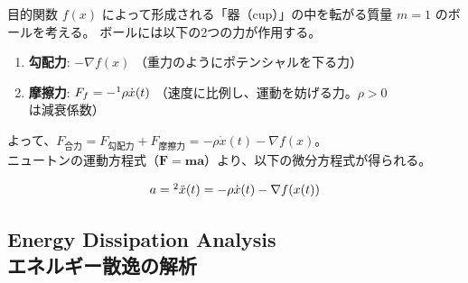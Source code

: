 \documentclass[dvipdfmx,a4paper,11pt]{jsarticle}
\begin{document}
目的関数 $f(x)$ によって形成される「器（cup）」の中を転がる質量 $m=1$ のボールを考える。
ボールには以下の2つの力が作用する。
\begin{enumerate}
    \item \textbf{勾配力}: $-\nabla f(x)$ （重力のようにポテンシャルを下る力）
    \item \textbf{摩擦力}: $F_f = -\footnotemark[1]\rho \dot{x}(t)$ （速度に比例し、運動を妨げる力。$\rho > 0$ は減衰係数）
\end{enumerate}
\noindent
よって、$F_{\textbf{合力}} = F_{\textbf{勾配力}} + F_{\textbf{摩擦力}} = - \rho \dot{x}(t) -\nabla f(x)$。\\
ニュートンの運動方程式（$\mathbf{F=ma}$）より、以下の微分方程式が得られる。

\begin{equation}
    a =\footnotemark[2]\ddot{x}(t) = -\rho \dot{x}(t) - \nabla f(x(t)) \label{eq:newton_friction}
\end{equation}
\subsection{Energy Dissipation Analysis\\ エネルギー散逸の解析}
\end{document}
